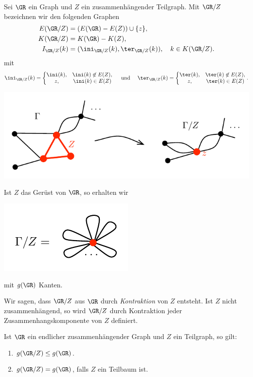 \DB Sei $\GR$ ein Graph und $Z$ ein zusammenhängender Teilgraph.
Mit $\GR/Z$ bezeichnen
wir den folgenden Graphen
\begin{align*}
E(\GR/Z) &= ( E(\GR)-E(Z) )\cup\{z\},\\
K(\GR/Z) &= K(\GR)-K(Z),\\
I_{\GR/Z}(k) &= (\ini_{\GR/Z}(k),\ter_{\GR/Z}(k)), \quad k\in K(\GR/Z).
\end{align*}
mit
\[
\ini_{\GR/Z}(k) =
\left\{\begin{matrix}
\ini(k), & \ini(k)\not\in E(Z),\\
z, & \ini(k)\in E(Z)
\end{matrix}\right.
\quad
\text{ und }
\quad
\ter_{\GR/Z}(k) =
\left\{\begin{matrix}
\ter(k), & \ter(k)\not\in E(Z),\\
z, & \ter(k)\in E(Z)
\end{matrix}\right.
.
\]
\begin{center}
	\includegraphics{grugraImages/GZ1}
\end{center}

\BSP Ist $Z$ das Gerüst von $\GR$, so erhalten wir
\begin{center}
	\includegraphics{grugraImages/GZ2}
\end{center}
mit $g(\GR)$ Kanten.

\DEF
Wir sagen, dass $\GR/Z$ aus $\GR$ durch \emph{Kontraktion}
von $Z$ entsteht.
Ist $Z$ nicht zusammenhängend, so wird $\GR/Z$ durch Kontraktion
jeder Zusammen\-hangskomponente von $Z$ definiert.

\BEM \label{bem_GZ}
Ist $\GR$ ein endlicher zusammenhängender Graph und $Z$ ein
Teilgraph, so gilt:
\begin{enumerate}
\item $g(\GR/Z) \leq g(\GR)$.
\item $g(\GR/Z) = g(\GR)$, falls $Z$ ein Teilbaum ist.
\end{enumerate}

